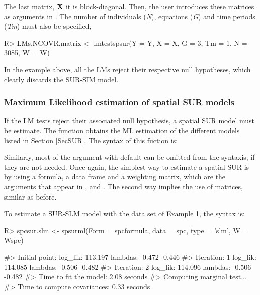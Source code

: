 \documentclass[article]{jss}
\begin{document}
The last matrix, \(\bf X\) it is block-diagonal. Then, the user introduces these matrices as arguments in . The number of individuals (\emph{N}), equations (\emph{G}) and time periods (\emph{Tm}) must also be specified,

\begin{CodeChunk}

\begin{CodeInput}
R> LMs.NCOVR.matrix <- lmtestspsur(Y = Y, X = X, G = 3, Tm = 1, N = 3085, W = W)
\end{CodeInput}
\end{CodeChunk}

In the example above, all the LMs reject their respective null hypotheses, which clearly discards the SUR-SIM model.

\hypertarget{ml}{%
\subsubsection{Maximum Likelihood estimation of spatial SUR models}\label{ml}}

If the LM tests reject their associated null hypothesis, a spatial SUR model must be estimate. The function  obtains the ML estimation of the different models listed in Section \ref{SecSUR}. The syntax of this fuction is:


Similarly, most of the argument with  default can be omitted from the syntaxis, if they are not needed. Once again, the simplest way to estimate a spatial SUR is by using a formula, a data frame and a weighting matrix, which are the arguments that appear in ,  and . The second way implies the use of matrices, similar as before.

To estimate a SUR-SLM model with the data set of Example 1, the syntax is:

\begin{CodeChunk}

\begin{CodeInput}
R> spcsur.slm <- spsurml(Form = spcformula, data = spc, type = 'slm', W = Wspc)
\end{CodeInput}

\begin{CodeOutput}
#> Initial point:   log_lik:  113.197  lambdas:  -0.472 -0.446 
#> Iteration:  1   log_lik:  114.085  lambdas:  -0.506 -0.482 
#> Iteration:  2   log_lik:  114.096  lambdas:  -0.506 -0.482 
#> Time to fit the model:  2.08  seconds
#> Computing marginal test... 
#> Time to compute covariances:  0.33  seconds
\end{CodeOutput}
\end{CodeChunk}
\end{document}
